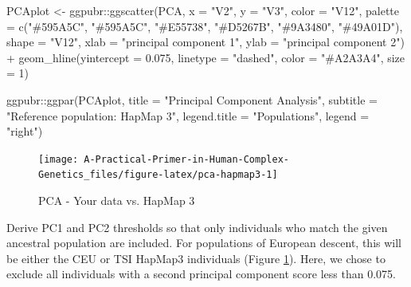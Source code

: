 \documentclass[
]{book}
\newenvironment{Shaded}{\begin{snugshade}}{\end{snugshade}}
\newcommand{\AttributeTok}[1]{\textcolor[rgb]{0.77,0.63,0.00}{#1}}
\newcommand{\DecValTok}[1]{\textcolor[rgb]{0.00,0.00,0.81}{#1}}
\newcommand{\FloatTok}[1]{\textcolor[rgb]{0.00,0.00,0.81}{#1}}
\newcommand{\FunctionTok}[1]{\textcolor[rgb]{0.00,0.00,0.00}{#1}}
\newcommand{\NormalTok}[1]{#1}
\newcommand{\OtherTok}[1]{\textcolor[rgb]{0.56,0.35,0.01}{#1}}
\newcommand{\SpecialCharTok}[1]{\textcolor[rgb]{0.00,0.00,0.00}{#1}}
\newcommand{\StringTok}[1]{\textcolor[rgb]{0.31,0.60,0.02}{#1}}
\begin{document}
\begin{Shaded}
\begin{Highlighting}[]
\NormalTok{PCAplot }\OtherTok{\textless{}{-}}\NormalTok{ ggpubr}\SpecialCharTok{::}\FunctionTok{ggscatter}\NormalTok{(PCA, }\AttributeTok{x =} \StringTok{"V2"}\NormalTok{, }\AttributeTok{y =} \StringTok{"V3"}\NormalTok{,}
                             \AttributeTok{color =} \StringTok{"V12"}\NormalTok{,}
                             \AttributeTok{palette =} \FunctionTok{c}\NormalTok{(}\StringTok{"\#595A5C"}\NormalTok{, }\StringTok{"\#595A5C"}\NormalTok{, }\StringTok{"\#E55738"}\NormalTok{, }\StringTok{"\#D5267B"}\NormalTok{, }\StringTok{"\#9A3480"}\NormalTok{, }\StringTok{"\#49A01D"}\NormalTok{),}
                             \AttributeTok{shape =} \StringTok{"V12"}\NormalTok{,}
                             \AttributeTok{xlab =} \StringTok{"principal component 1"}\NormalTok{, }\AttributeTok{ylab =} \StringTok{"principal component 2"}\NormalTok{) }\SpecialCharTok{+}
  \FunctionTok{geom\_hline}\NormalTok{(}\AttributeTok{yintercept =} \FloatTok{0.075}\NormalTok{, }\AttributeTok{linetype =} \StringTok{"dashed"}\NormalTok{,}
                \AttributeTok{color =} \StringTok{"\#A2A3A4"}\NormalTok{, }\AttributeTok{size =} \DecValTok{1}\NormalTok{)}

\NormalTok{  ggpubr}\SpecialCharTok{::}\FunctionTok{ggpar}\NormalTok{(PCAplot,}
                \AttributeTok{title =} \StringTok{"Principal Component Analysis"}\NormalTok{,}
                \AttributeTok{subtitle =} \StringTok{"Reference population: HapMap 3"}\NormalTok{,}
                \AttributeTok{legend.title =} \StringTok{"Populations"}\NormalTok{, }\AttributeTok{legend =} \StringTok{"right"}\NormalTok{)}
\end{Highlighting}
\end{Shaded}

\begin{figure}

{\centering \texttt{[image: A-Practical-Primer-in-Human-Complex-Genetics\_files/figure-latex/pca-hapmap3-1]} 

}

\caption{PCA - Your data vs. HapMap 3}\label{fig:pca-hapmap3}
\end{figure}

Derive PC1 and PC2 thresholds so that only individuals who match the given ancestral population are included. For populations of European descent, this will be either the CEU or TSI HapMap3 individuals (Figure \ref{fig:pca-hapmap3}). Here, we chose to exclude all individuals with a second principal component score less than 0.075.
\end{document}
